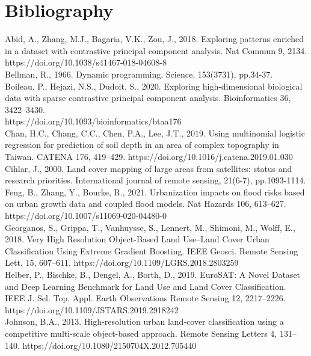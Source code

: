 \documentclass[11pt]{article}
\begin{document}
\section{Bibliography}
Abid, A., Zhang, M.J., Bagaria, V.K., Zou, J., 2018. Exploring patterns enriched in a dataset with contrastive principal component analysis. Nat Commun 9, 2134. https://doi.org/10.1038/s41467-018-04608-8\\

Bellman, R., 1966. Dynamic programming. Science, 153(3731), pp.34-37.\\

Boileau, P., Hejazi, N.S., Dudoit, S., 2020. Exploring high-dimensional biological data with sparse contrastive principal component analysis. Bioinformatics 36, 3422–3430. \\https://doi.org/10.1093/bioinformatics/btaa176\\

Chan, H.C., Chang, C.C., Chen, P.A., Lee, J.T., 2019. Using multinomial logistic regression for prediction of soil depth in an area of complex topography in Taiwan. CATENA 176, 419–429. https://doi.org/10.1016/j.catena.2019.01.030\\

Cihlar, J., 2000. Land cover mapping of large areas from satellites: status and research priorities. International journal of remote sensing, 21(6-7), pp.1093-1114.\\
 
Feng, B., Zhang, Y., Bourke, R., 2021. Urbanization impacts on flood risks based on urban growth data and coupled flood models. Nat Hazards 106, 613–627. https://doi.org/10.1007/s11069-020-04480-0\\

Georganos, S., Grippa, T., Vanhuysse, S., Lennert, M., Shimoni, M., Wolff, E., 2018. Very High Resolution Object-Based Land Use–Land Cover Urban Classification Using Extreme Gradient Boosting. IEEE Geosci. Remote Sensing Lett. 15, 607–611. https://doi.org/10.1109/LGRS.2018.2803259\\

Helber, P., Bischke, B., Dengel, A., Borth, D., 2019. EuroSAT: A Novel Dataset and Deep Learning Benchmark for Land Use and Land Cover Classification. IEEE J. Sel. Top. Appl. Earth Observations Remote Sensing 12, 2217–2226. https://doi.org/10.1109/JSTARS.2019.2918242\\

Johnson, B.A., 2013. High-resolution urban land-cover classification using a competitive multi-scale object-based approach. Remote Sensing Letters 4, 131–140. https://doi.org/10.1080/2150704X.2012.705440\\
\end{document}

